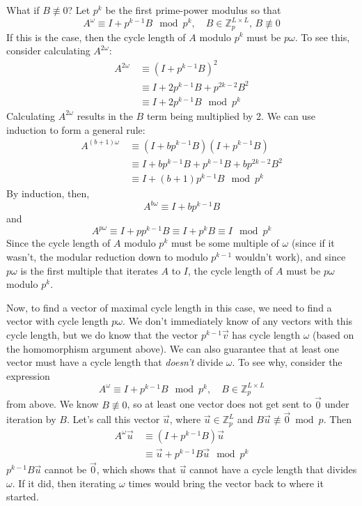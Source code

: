 \documentclass[a4paper, reqno, 12pt]{amsart}
\begin{document}
		What if $B \not\equiv 0$? Let $p^{k}$ be the first prime-power modulus so that
		\[
			A^{\omega} \equiv I + p^{k-1}B \mod{p^k}, \quad B \in \mathds{Z}_{p}^{L \times L}, \, B \not\equiv 0
		\]
		If this is the case, then the cycle length of $A$ modulo $p^k$ must be $p\omega$. To see this, consider calculating $A^{2\omega}$:
		\begin{align*}
			A^{2\omega} \, &\equiv (I + p^{k-1}B)^2 \\
			            \, &\equiv I + 2p^{k-1}B + p^{2k-2}B^2 \\
						\, &\equiv I + 2p^{k-1}B \mod{p^k}
		\end{align*}
		Calculating $A^{2\omega}$ results in the $B$ term being multiplied by 2. We can use induction to form a general rule:
		\begin{align*}
			A^{(b+1)\omega} \, &\equiv (I + bp^{k-1}B)(I + p^{k-1}B) \\
			                \, &\equiv I + bp^{k-1}B + p^{k-1}B + bp^{2k-2}B^{2} \\
							\, &\equiv I + (b+1)p^{k-1}B \mod{p^k}
		\end{align*}
		By induction, then,
		\[
			A^{b\omega} \equiv I + bp^{k-1}B
		\]
		and
		\[
			A^{p\omega} \equiv I + pp^{k-1}B \equiv I + p^{k}B \equiv I \mod{p^k}
		\]
		Since the cycle length of $A$ modulo $p^k$ must be some multiple of $\omega$ (since if it wasn't, the modular reduction down to modulo $p^{k-1}$ wouldn't 
		work), and since $p\omega$ is the first multiple that iterates $A$ to $I$, the cycle length of $A$ must be $p\omega$ modulo $p^k$.
		
		Now, to find a vector of maximal cycle length in this case, we need to find a vector with cycle length $p\omega$. We don't immediately know of any vectors
		with this cycle length, but we do know that the vector $p^{k-1}\vec{v}$ has cycle length $\omega$ (based on the homomorphism argument above). We can also 
		guarantee that at least one vector must have a cycle length that \emph{doesn't} divide $\omega$. To see why, consider the expression
		\[
			A^{\omega} \equiv I + p^{k-1}B \mod{p^k}, \quad B \in \mathds{Z}_{p}^{L \times L}
		\]
		from above. We know $B \not\equiv 0$, so at least one vector does not get sent to $\vec{0}$ under iteration by $B$. Let's call this vector $\vec{u}$,
		where $\vec{u} \in \mathds{Z}_{p}^{L}$ and $B\vec{u} \not\equiv \vec{0} \bmod{p}$. Then
		\begin{align*}
			A^{\omega}\vec{u} \, &\equiv (I + p^{k-1}B)\vec{u} \\
							  \, &\equiv \vec{u} + p^{k-1}B\vec{u} \mod{p^k}
		\end{align*}
		$p^{k-1}B\vec{u}$ cannot be $\vec{0}$, which shows that $\vec{u}$ cannot have a cycle length that divides $\omega$. If it did, then iterating $\omega$ times
		would bring the vector back to where it started.
		
\end{document}
